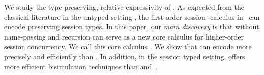 We study the type-preserving, 
relative expressivity of \HOp. %
As expected from 
the classical literature in the untyped setting \cite{SangiorgiD:expmpa}, 
the first-order session \sessp-calculus  
in~\cite{honda.vasconcelos.kubo:language-primitives} can encode  
\HOp preserving session types. 
In this paper, 
our \emph{main discovery} is 
that 
\HOp 
without
name-passing and recursion
can serve as a new core calculus    
for higher-order session concurrency.  
We call this core calculus \HO. 
We show that \HO can encode \HOp more precisely and efficiently 
than \sessp. In addition, in the session typed setting, 
\HO offers more efficient bisimulation techniques 
than \HOp and~\sessp. 







